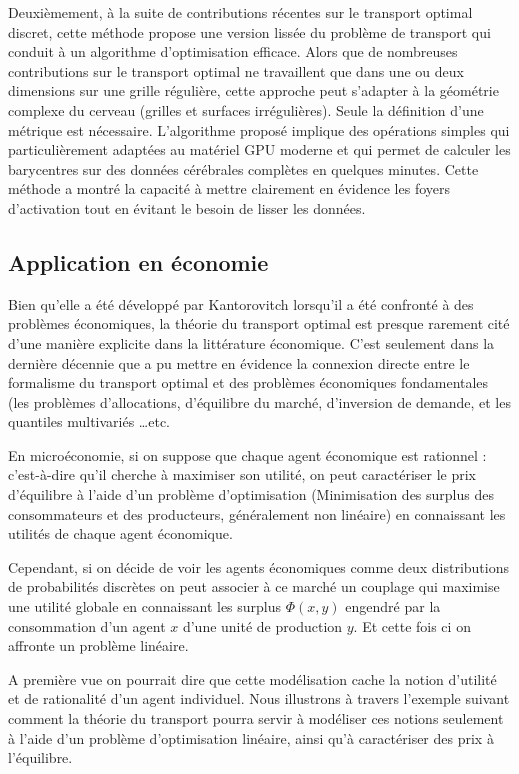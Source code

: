 \documentclass[
    8.2pt,
    a4paper,
    logo,
    twocolumn
]{template}
\begin{document}
    Deuxièmement, à la suite de contributions récentes sur le transport optimal discret, cette méthode propose une version lissée du problème de transport qui conduit à un algorithme d’optimisation efficace.  Alors que de nombreuses contributions sur le transport optimal ne travaillent que dans une ou deux dimensions sur une grille régulière, cette approche peut s'adapter à la géométrie complexe du cerveau (grilles et surfaces irrégulières). Seule la définition d'une métrique est nécessaire. L'algorithme proposé implique des opérations simples qui particulièrement adaptées au matériel GPU moderne et qui permet de calculer les barycentres sur des données cérébrales complètes en quelques minutes. Cette méthode a montré la capacité à mettre clairement en évidence les foyers d'activation tout en évitant le besoin de lisser les données.



    \subsection{Application en économie}
    Bien qu’elle a été développé par Kantorovitch lorsqu’il a été confronté à des problèmes économiques, la théorie du transport optimal est presque rarement cité d’une manière explicite dans la littérature économique. C’est seulement dans la dernière décennie que \citet{galichon_optimal_2016} a pu mettre en évidence la connexion directe entre le formalisme du transport optimal et des problèmes économiques fondamentales (les problèmes d’allocations, d’équilibre du marché, d’inversion de demande, et les quantiles multivariés \dots etc.

    En microéconomie, si on suppose que chaque agent économique est rationnel : c’est-à-dire qu’il cherche à maximiser son utilité, on peut caractériser le prix d’équilibre à l’aide d’un problème d’optimisation (Minimisation des surplus des consommateurs et des producteurs, généralement non linéaire) en connaissant les utilités de chaque agent économique.

    Cependant, si on décide de voir les agents économiques comme deux distributions de probabilités discrètes on peut associer à ce marché un couplage qui maximise une utilité globale en connaissant les surplus $\Phi(x,y)$ engendré par la consommation d’un agent $x$ d’une unité de production $y$. Et cette fois ci on affronte un problème linéaire.

    A première vue on pourrait dire que cette modélisation cache la notion d'utilité et de rationalité d'un agent individuel. Nous illustrons à travers l’exemple suivant comment la théorie du transport pourra servir à modéliser ces notions seulement à l'aide d'un problème d'optimisation linéaire, ainsi qu'à  caractériser des prix à l'équilibre.
\end{document}
